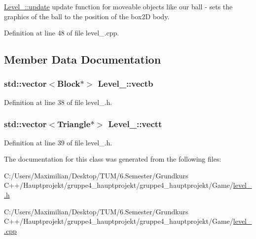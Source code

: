 \hyperlink{class_level__4_a6feb653af7857552934d71edd3754a49}{Level\+\_\+::update} update function for moveable objects like our ball -\/ sets the graphics of the ball to the position of the box2D body. 



Definition at line 48 of file level\+\_.\+cpp.



\subsection{Member Data Documentation}
\subsubsection[{\texorpdfstring{vectb}{vectb}}]{\setlength{\rightskip}{0pt plus 5cm}std\+::vector$<${\bf Block}$\ast$$>$ Level\+\_\+::vectb}\hypertarget{class_level__4_a7405e54cfaa0373b5114d838f0f39cc7}{}\label{class_level__4_a7405e54cfaa0373b5114d838f0f39cc7}


Definition at line 38 of file level\+\_.\+h.

\subsubsection[{\texorpdfstring{vectt}{vectt}}]{\setlength{\rightskip}{0pt plus 5cm}std\+::vector$<${\bf Triangle}$\ast$$>$ Level\+\_\+::vectt}\hypertarget{class_level__4_acdd42e79e1b0dbd8bddce42277a20984}{}\label{class_level__4_acdd42e79e1b0dbd8bddce42277a20984}


Definition at line 39 of file level\+\_.\+h.



The documentation for this class was generated from the following files\+:\begin{DoxyCompactItemize}
\item 
C\+:/\+Users/\+Maximilian/\+Desktop/\+T\+U\+M/6.\+Semester/\+Grundkurs C++/\+Hauptprojekt/gruppe4\+\_\+hauptprojekt/gruppe4\+\_\+hauptprojekt/\+Game/\hyperlink{level__4_8h}{level\+\_.\+h}\item 
C\+:/\+Users/\+Maximilian/\+Desktop/\+T\+U\+M/6.\+Semester/\+Grundkurs C++/\+Hauptprojekt/gruppe4\+\_\+hauptprojekt/gruppe4\+\_\+hauptprojekt/\+Game/\hyperlink{level__4_8cpp}{level\+\_.\+cpp}\end{DoxyCompactItemize}
